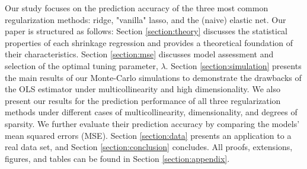 
\noindent Our study focuses on the prediction accuracy of the three most common regularization methods: ridge, "vanilla" lasso, and the (naive) elastic net. Our paper is structured as follows: Section \ref{section:theory} discusses the statistical properties of each shrinkage regression and provides a theoretical foundation of their characteristics. Section \ref{section:mse} discusses model assessment and selection of the optimal tuning parameter, $\lambda$. Section \ref{section:simulation} presents the main results of our Monte-Carlo simulations to demonstrate the drawbacks of the OLS estimator under multicollinearity and high dimensionality. We also present our results for the prediction performance of all three regularization methods under different cases of multicollinearity, dimensionality, and degrees of sparsity. We further evaluate their prediction accuracy by comparing the models' mean squared errors (MSE). Section \ref{section:data} presents an application to a real data set,
and Section \ref{section:conclusion} concludes.  All proofs, extensions, figures, and tables can be found in Section \ref{section:appendix}. 
 
